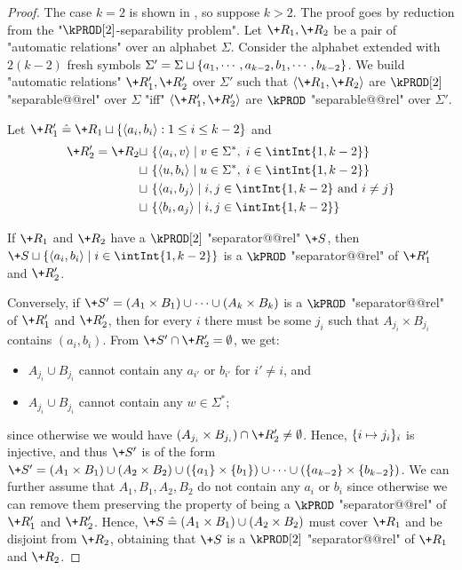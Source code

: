 \begin{proof}
    The case $k=2$ is shown in , so suppose $k>2$.
    The proof goes by reduction from the "$\kPROD[2]$-separability problem". Let $\+R_1,\+R_2$ be a pair of "automatic relations" over an alphabet $\Sigma$. Consider the alphabet extended with $2(k-2)$ fresh symbols $\Sigma' = \Sigma \sqcup \{a_1, \cdots, a_{k-2}, b_1, \cdots, b_{k-2}\}$. We build "automatic relations" $\+R'_1,\+R'_2$ over $\Sigma'$ such that $\tup{\+R_1, \+R_2}$ are $\kPROD[2]$ "separable@@rel" over $\Sigma$ "iff" $\tup{\+R'_1, \+R'_2}$ are $\kPROD$ "separable@@rel" over $\Sigma'$.

    Let $\+R'_1 \defeq \+R_1 \dcup \set{\tup{a_i,b_i} : 1 \leq i \leq k-2}$ and 
    \begin{align*}
    \+R'_2 =  \+R_2 \dcup~&\set{\tup{a_i,v} \mid v \in \Sigma^*,\; i \in \intInt{1,k-2}} \\
    \dcup~&\set{\tup{u,b_i} \mid u \in \Sigma^*,\; i \in \intInt{1,k-2}}\\
    \dcup~&\set{\tup{a_i,b_j} \mid i,j \in \intInt{1,k-2} \text{ and } i \neq j}\\
    \dcup~&\set{\tup{b_i,a_j} \mid i,j \in \intInt{1,k-2}}
    \end{align*}
    
    If $\+R_1$ and $\+R_2$ have a $\kPROD[2]$ "separator@@rel" $\+S$, then $\+S \dcup \set{\tup{a_i,b_i} \mid i \in \intInt{1,k-2}}$ is a $\kPROD$ "separator@@rel" of $\+R'_1$ and $\+R'_2$.
    

    Conversely, if $\+S' = (A_1 \times B_1) \cup \dotsb \cup (A_k \times B_k)$ is a $\kPROD$ "separator@@rel" of $\+R'_1$ and $\+R'_2$, then for every $i$ there must be some $j_i$ such that $A_{j_i} \times B_{j_i}$ contains $(a_i,b_i)$. From $\+S' \cap \+R'_2 = \emptyset$, we get:
    \begin{itemize}
        \item $A_{j_i} \cup B_{j_i}$ cannot contain any $a_{i'}$ or $b_{i'}$ for $i' \neq i$, and
        \item $A_{j_i} \cup B_{j_i}$ cannot contain any $w \in \Sigma^*$;
    \end{itemize}
    since otherwise we would have $(A_{j_i} \times B_{j_i}) \cap \+R'_2 \neq \emptyset$.
    Hence, $\{i \mapsto j_i\}_i$ is injective, and thus $\+S'$ is of the form $\+S' = (A_1 \times B_1) \cup (A_2 \times B_2)  \cup (\set{a_1} \times \set{b_1}) \cup \dotsb \cup (\set{a_{k-2}} \times \set{b_{k-2}})$. We can further assume that $A_1,B_1,A_2,B_2$ do not contain any $a_i$ or $b_i$ since otherwise we can remove them preserving the property of being a $\kPROD$ "separator@@rel" of $\+R'_1$ and $\+R'_2$.
    Hence, $\+S \defeq (A_1 \times B_1) \cup (A_2 \times B_2)$ must cover $\+R_1$ and be disjoint from $\+R_2$, obtaining that $\+S$ is a $\kPROD[2]$ "separator@@rel" of $\+R_1$ and $\+R_2$.
\end{proof}


